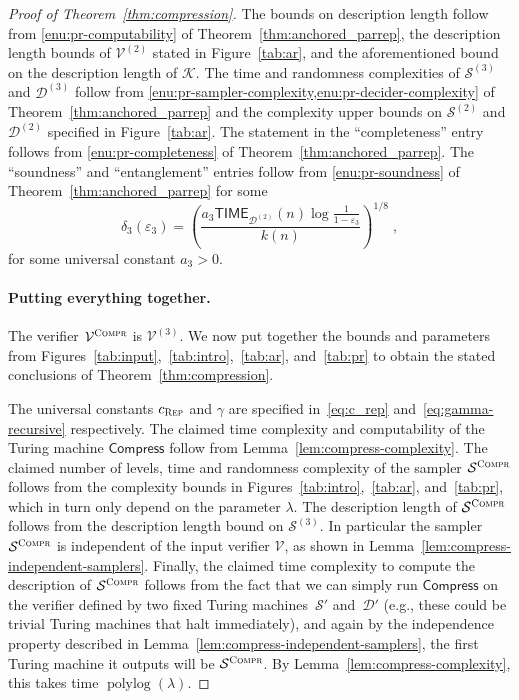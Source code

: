 \documentclass[11pt]{article}
\theoremstyle{definition}
\newcommand{\eps}{\varepsilon}
\DeclareMathOperator{\polylog}{polylog}
\newcommand{\sampler}{\mathcal{S}}
\newcommand{\decider}{\mathcal{D}}
\newcommand{\verifier}{\mathcal{V}}
\newcommand{\gamestyle}[1]{\ensuremath{\textsc{#1}}\xspace}
\newcommand{\compr}{\textsc{Compr}}
\renewcommand{\cal}[1]{\mathcal{#1}}
\newcommand{\TIME}{\mathsf{TIME}}
\newcommand{\tmstyle}[1]{\ensuremath{\mathsf{#1}}}
\newcommand{\Compress}{\tmstyle{Compress}}
\newcommand{\rep}{\gamestyle{Rep}}
\begin{document}
\begin{proof}[Proof of Theorem~\ref{thm:compression}]
  The bounds on description length follow from \cref{enu:pr-computability} of
  Theorem~\ref{thm:anchored_parrep}, the description length bounds of
  $\verifier^{(2)}$ stated in Figure~\ref{tab:ar}, and the aforementioned bound
  on the description length of $\cal{K}$.
  The time and randomness complexities of $\sampler^{(3)}$ and $\decider^{(3)}$
  follow from \cref{enu:pr-sampler-complexity,enu:pr-decider-complexity} of
  Theorem~\ref{thm:anchored_parrep} and the complexity upper bounds on
  $\sampler^{(2)}$ and $\decider^{(2)}$ specified in Figure~\ref{tab:ar}.
  The statement in the ``completeness'' entry follows from
  \cref{enu:pr-completeness} of Theorem~\ref{thm:anchored_parrep}.
  The ``soundness'' and ``entanglement'' entries follow from
  \cref{enu:pr-soundness} of Theorem~\ref{thm:anchored_parrep} for some
  \begin{equation}
    \label{eq:compr-delta-3}
    \delta_3(\eps_3) = \left (\frac{a_3 \TIME_{\decider^{(2)}}(n)
        \log \frac{1}{1 - \eps_3}}{k(n)} \right)^{1/8}\;,
  \end{equation}
  for some universal constant $a_3 > 0$.

  \paragraph{Putting everything together.}
  The verifier $\verifier^\compr$ is $\verifier^{(3)}$.
  We now put together the bounds and parameters from
  Figures~\ref{tab:input},~\ref{tab:intro},~\ref{tab:ar}, and~\ref{tab:pr} to
  obtain the stated conclusions of Theorem~\ref{thm:compression}.

  The universal constants $c_\rep$ and $\gamma$ are specified
  in~\eqref{eq:c_rep} and~\eqref{eq:gamma-recursive} respectively.
  The claimed time complexity and computability of the Turing machine
  $\Compress$ follow from Lemma~\ref{lem:compress-complexity}.
  The claimed number of levels, time and randomness complexity of the sampler
  $\sampler^\compr$ follows from the complexity bounds in
  Figures~\ref{tab:intro},~\ref{tab:ar}, and~\ref{tab:pr}, which in turn only
  depend on the parameter $\lambda$.
  The description length of $\sampler^\compr$ follows from the description
  length bound on $\sampler^{(3)}$.
  In particular the sampler $\sampler^\compr$ is {independent} of the input
  verifier $\verifier$, as shown in
  Lemma~\ref{lem:compress-independent-samplers}.
  Finally, the claimed time complexity to compute the description of
  $\sampler^\compr$ follows from the fact that we can simply run $\Compress$ on
  the verifier defined by two fixed Turing machines~$\sampler'$ and~$\decider'$
  (e.g., these could be trivial Turing machines that halt immediately), and
  again by the independence property described in
  Lemma~\ref{lem:compress-independent-samplers}, the first Turing machine it
  outputs will be $\sampler^\compr$.
  By Lemma~\ref{lem:compress-complexity}, this takes time $\polylog(\lambda)$.


\end{proof}
\end{document}
